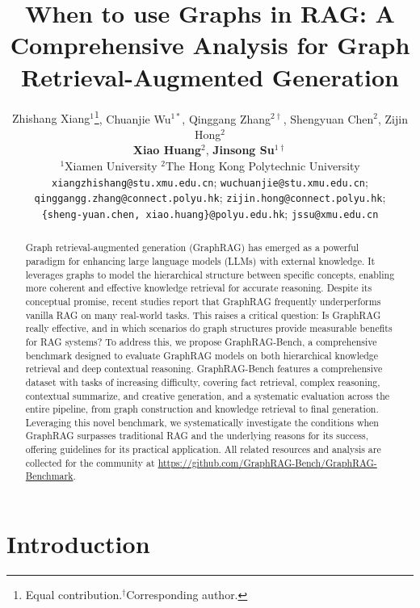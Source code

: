 \documentclass{article} %
\title{When to use Graphs in RAG: A Comprehensive
Analysis for Graph Retrieval-Augmented Generation}
\author{
{Zhishang Xiang$^{1}$}\thanks{Equal contribution.$^{\dagger}$Corresponding author.}, 
Chuanjie Wu$^{1*}$, 
Qinggang Zhang$^{2\dagger}$, 
Shengyuan Chen$^{2}$, 
Zijin Hong$^{2}$ \\
\textbf{Xiao Huang}$^{2}$, 
\textbf{Jinsong Su}$^{1\dagger}$\\
$^{1}$Xiamen University \quad $^{2}$The Hong Kong Polytechnic University\\
\texttt{xiangzhishang@stu.xmu.edu.cn}; \texttt{wuchuanjie@stu.xmu.edu.cn};\\
\texttt{qinggangg.zhang@connect.polyu.hk}; \texttt{zijin.hong@connect.polyu.hk};\\
\texttt{\{sheng-yuan.chen, xiao.huang\}@polyu.edu.hk};
\texttt{jssu@xmu.edu.cn}
}
\begin{document}
\maketitle

\begin{abstract}
Graph retrieval-augmented generation (GraphRAG) has emerged as a powerful paradigm for enhancing large language models (LLMs) with external knowledge. It leverages graphs to model the hierarchical structure between specific concepts, enabling more coherent and effective knowledge retrieval for accurate reasoning. Despite its conceptual promise, recent studies report that GraphRAG frequently underperforms vanilla RAG on many real-world tasks. This raises a critical question: Is GraphRAG really effective, and in which scenarios do graph structures provide measurable benefits for RAG systems? To address this, we propose GraphRAG-Bench, a comprehensive benchmark designed to evaluate GraphRAG models on both hierarchical knowledge retrieval and deep contextual reasoning. GraphRAG-Bench features a comprehensive dataset with tasks of increasing difficulty, covering fact retrieval, complex reasoning, contextual summarize, and creative generation, and a systematic evaluation across the entire pipeline, from graph construction and knowledge retrieval to final generation. Leveraging this novel benchmark, we systematically investigate the conditions when GraphRAG surpasses traditional RAG and the underlying reasons for its success, offering guidelines for its practical application. All related resources and analysis are collected for the community at \textcolor{blue}{\url{https://github.com/GraphRAG-Bench/GraphRAG-Benchmark}}.
\end{abstract}


\section{Introduction}
\end{document}
